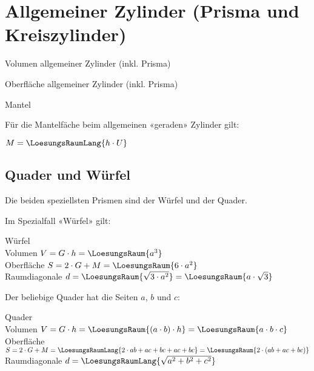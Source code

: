 \section{Allgemeiner Zylinder (Prisma und Kreiszylinder)}


\begin{gesetz}{Volumen allgemeiner Zylinder (inkl. Prisma)}{}

  \begin{center}\end{center}
\end{gesetz}

\begin{gesetz}{Oberfläche allgemeiner Zylinder (inkl. Prisma)}{}

  \begin{center}\end{center}
\end{gesetz}

\begin{bemerkung}{Mantel}{}
  
  Für die Mantelfäche beim allgemeinen «geraden» Zylinder gilt:

  $M = \LoesungsRaumLang{h \cdot U}$
\end{bemerkung}


\newpage
\subsection{Quader und Würfel}\label{QuaderUndWuerfel}
Die beiden speziellsten Prismen sind der Würfel und der Quader.

Im Spezialfall «Würfel» gilt:
\begin{gesetz}{Würfel}{}\\
  Volumen $V = G\cdot{} h = \LoesungsRaum{a^3}$\\
  Oberfläche $S=2\cdot{}G + M = \LoesungsRaum{6\cdot{}a^2}$\\
  Raumdiagonale $d = \LoesungsRaum{\sqrt{3\cdot{}a^2}} = \LoesungsRaum{a\cdot{}\sqrt{3}}$
\end{gesetz}


Der beliebige Quader hat die Seiten $a$, $b$ und $c$:
\begin{gesetz}{Quader}{}\\
  Volumen $V = G\cdot{} h = \LoesungsRaum{(a\cdot{}b)\cdot{}h} = \LoesungsRaum{a\cdot{}b\cdot{}c}$\\
  Oberfläche $S=2\cdot{}G + M = \LoesungsRaumLang{2\cdot{}ab + ac + bc + ac + bc} = \LoesungsRaum{2\cdot{}(ab + ac + bc)}$\\
  Raumdiagonale $d = \LoesungsRaumLang{\sqrt{a^2 + b^2 + c^2}}$
\end{gesetz}

